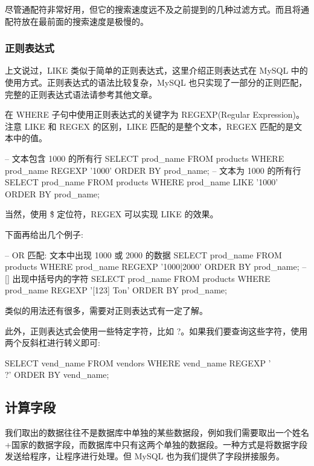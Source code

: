 尽管通配符非常好用，但它的搜索速度远不及之前提到的几种过滤方式。而且将通配符放在最前面的搜索速度是极慢的。

\subsubsection{正则表达式}

上文说过，LIKE 类似于简单的正则表达式，这里介绍正则表达式在 MySQL 中的使用方式。正则表达式的语法比较复杂，MySQL 也只实现了一部分的正则匹配，完整的正则表达式语法请参考其他文章。

在 WHERE 子句中使用正则表达式的关键字为 REGEXP(Regular Expression)。注意 LIKE 和 REGEX 的区别，LIKE 匹配的是整个文本，REGEX 匹配的是文本中的值。

\begin{sql}
-- 文本包含 1000 的所有行
SELECT prod_name
    FROM products
    WHERE prod_name REGEXP '1000'
    ORDER BY prod_name;
-- 文本为 1000 的所有行
SELECT prod_name
    FROM products
    WHERE prod_name LIKE '1000'
    ORDER BY prod_name;
\end{sql}

当然，使用 \^  \$ 定位符，REGEX 可以实现 LIKE 的效果。

下面再给出几个例子:
\begin{sql}
-- OR 匹配: 文本中出现 1000 或 2000 的数据
SELECT prod_name
    FROM products
    WHERE prod_name REGEXP '1000|2000'
    ORDER BY prod_name;
-- [] 出现中括号内的字符
SELECT prod_name
    FROM products
    WHERE prod_name REGEXP '[123] Ton'
    ORDER BY prod_name;
\end{sql}

类似的用法还有很多，需要对正则表达式有一定了解。

此外，正则表达式会使用一些特定字符，比如 ?。如果我们要查询这些字符，使用两个反斜杠进行转义即可:

\begin{sql}
SELECT vend_name
    FROM vendors
    WHERE vend_name REGEXP '\\?'
    ORDER BY vend_name;
\end{sql}

\subsection{计算字段}

我们取出的数据往往不是数据库中单独的某些数据段，例如我们需要取出一个姓名+国家的数据字段，而数据库中只有这两个单独的数据段。一种方式是将数据字段发送给程序，让程序进行处理。但 MySQL 也为我们提供了字段拼接服务。

